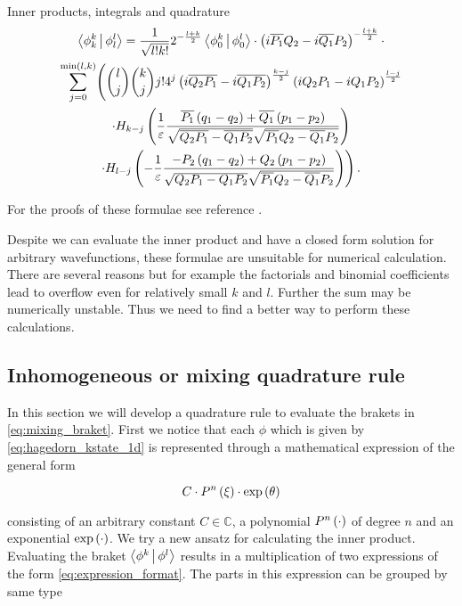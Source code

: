 \begin{chapter}{Inner products, integrals and quadrature}
\begin{multline} \label{eq:mixing_braket}
  \Braket{ \phi_k^k | \phi_l^l } =
  \frac{1}{\sqrt{l!k!}} 2^{-\frac{l+k}{2}} \Braket{ \phi_0^k | \phi_0^l } \cdot
  \left(i \overline{ P_1} Q_2 - i \overline{Q_1} P_2\right)^{-\frac{l+k}{2}} \cdot \\
  \sum_{j=0}^{\min\left(l,k\right)}
    \Biggl(
      \binom{l}{j} \binom{k}{j} j! 4^j \left(i \overline{Q_2 P_1}-i\overline{Q_1 P_2}\right)^{\frac{k-j}{2}}
      \left(i Q_2  P_1 - i Q_1  P_2\right)^{\frac{l-j}{2}}
      \\
      \cdot H_{k-j}\left(\frac{1}{\varepsilon}
                   \frac{\overline{ P_1}\left(q_1-q_2\right)+\overline{Q_1}\left(p_1-p_2\right)}
                        {\sqrt{\overline{Q_2 P_1}-\overline{Q_1 P_2}}\sqrt{\overline{ P_1}Q_2-\overline{Q_1} P_2}}\right)
      \\
      \cdot H_{l-j}\left(-\frac{1}{\varepsilon}
                    \frac{-P_2\left(q_1-q_2\right)+Q_2\left(p_1-p_2\right)}
                         {\sqrt{Q_2 P_1 - Q_1 P_2}\sqrt{\overline{P_1}Q_2-\overline{Q_1} P_2}}\right)
    \Biggr) \,.
\end{multline}

For the proofs of these formulae see reference \cite{H_R_quantization_rules}.

Despite we can evaluate the inner product and have a closed form solution for arbitrary
wavefunctions, these formulae are unsuitable for numerical calculation. There are
several reasons but for example the factorials and binomial coefficients lead to
overflow even for relatively small $k$ and $l$. Further the sum may be numerically
unstable. Thus we need to find a better way to perform these calculations.


\subsection{Inhomogeneous or mixing quadrature rule}
\label{sec:mixing_quadrature}

In this section we will develop a quadrature rule to evaluate the brakets in \eqref{eq:mixing_braket}.
First we notice that each $\phi$ which is given by \eqref{eq:hagedorn_kstate_1d}
is represented through a mathematical expression of the general form

\begin{equation} \label{eq:expression_format}
  C \cdot P^n\left( \xi \right) \cdot \exp \left( \theta \right)
\end{equation}

consisting of an arbitrary constant $C \in \mathbb{C}$, a polynomial $P^n\left( \cdot \right)$
of degree $n$ and an exponential $\exp\left( \cdot \right)$. We try a new ansatz for calculating
the inner product. Evaluating the braket $\Braket{\phi^k | \phi^l}$ results in a
multiplication of two expressions of the form \eqref{eq:expression_format}. The
parts in this expression can be grouped by same type


\end{chapter}
